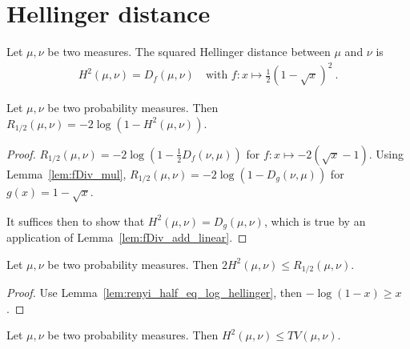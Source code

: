 \chapter{Hellinger distance}

\begin{definition}
  \label{def:Hellinger}
  \leanok
  Let $\mu, \nu$ be two measures. The squared Hellinger distance between $\mu$ and $\nu$ is
  \begin{align*}
    H^2(\mu, \nu) = D_f(\mu, \nu) \quad \text{with } f: x \mapsto \frac{1}{2}\left( 1 - \sqrt{x} \right)^2 \: .
  \end{align*}
\end{definition}

\begin{lemma}
  \label{lem:renyi_half_eq_log_hellinger}
  Let $\mu, \nu$ be two probability measures. Then $R_{1/2}(\mu, \nu) = -2\log(1 - H^2(\mu, \nu))$.
\end{lemma}

\begin{proof}
$R_{1/2}(\mu, \nu) = -2 \log (1 - \frac{1}{2} D_f(\nu, \mu))$ for $f : x \mapsto -2 (\sqrt{x} - 1)$. Using Lemma~\ref{lem:fDiv_mul}, $R_{1/2}(\mu, \nu) = -2 \log (1 - D_g(\nu, \mu))$ for $g(x) = 1 - \sqrt{x}$.

It suffices then to show that $H^2(\mu, \nu) = D_g(\mu, \nu)$, which is true by an application of Lemma~\ref{lem:fDiv_add_linear}.
\end{proof}

\begin{lemma}
  \label{lem:hellinger_le_renyi}
  Let $\mu, \nu$ be two probability measures. Then $2 H^2(\mu, \nu) \le R_{1/2}(\mu, \nu)$.
\end{lemma}

\begin{proof}
Use Lemma~\ref{lem:renyi_half_eq_log_hellinger}, then $-\log(1 - x) \ge x$.
\end{proof}

\begin{lemma}
  \label{lem:hellinger_le_tv}
  Let $\mu, \nu$ be two probability measures. Then $H^2(\mu, \nu) \le TV(\mu, \nu)$.
\end{lemma}


